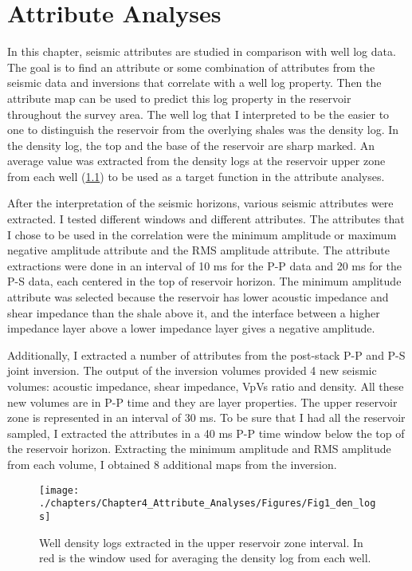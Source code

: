 \chapter{Attribute Analyses}

	 In this chapter, seismic attributes are studied in comparison with well log data. The goal is to find an attribute or some combination of attributes from the seismic data and inversions that correlate with a well log property. Then the attribute map can be used to predict this log property in the reservoir throughout the survey area. The well log that I interpreted to be the easier to one to distinguish the reservoir from the overlying shales was the density log. In the density log, the top and the base of the reservoir are sharp marked. An average value was extracted from the density logs at the reservoir upper zone from each well (\ref{fig:density_logs}) to be used as a target function in the attribute analyses.
	 
	 After the interpretation of the seismic horizons, various seismic attributes were extracted. I tested different windows and different attributes. The attributes that I chose to be used in the correlation were the minimum amplitude or maximum negative amplitude attribute and the RMS amplitude attribute. The attribute extractions were done in an interval of 10 ms for the P-P data and 20 ms for the P-S data, each centered in the top of reservoir horizon.  The minimum amplitude attribute was selected because the reservoir has lower acoustic impedance and shear impedance than the shale above it, and the interface between a higher impedance layer above a lower impedance layer gives a negative amplitude.
	 
	Additionally, I extracted a number of attributes from the post-stack P-P and P-S joint inversion. The output of the inversion volumes provided 4 new seismic volumes: acoustic impedance, shear impedance, VpVs ratio and density. All these new volumes are in P-P time and they are layer properties. The upper reservoir zone is represented in an interval of 30 ms. To be sure that I had all the reservoir sampled, I extracted the attributes in a 40 ms P-P time window below the top of the reservoir horizon. Extracting the minimum amplitude and RMS amplitude from each volume, I obtained 8 additional maps  from the inversion. 
	
	
\begin{figure}[hbtp]
	\begin{center}
	\texttt{[image: ./chapters/Chapter4\_Attribute\_Analyses/Figures/Fig1\_den\_logs]}
			\caption[Well density logs extracted in the reservoir interval.]{Well density logs extracted in the upper reservoir zone interval. In red is the window used for averaging the density log from each well.}
			\label{fig:density_logs}
		\end{center}
	\end{figure}	



